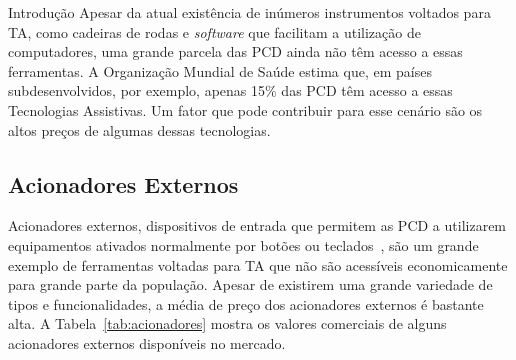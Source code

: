 \begin{chapter}{Introdução}
Apesar da atual existência de inúmeros instrumentos voltados para TA, como
cadeiras de rodas e \textit{software} que facilitam a utilização de
computadores, uma grande parcela das PCD ainda não têm acesso a essas
ferramentas. A Organização Mundial de Saúde estima que, em países
subdesenvolvidos, por exemplo, apenas 15\% das PCD têm acesso a essas Tecnologias
Assistivas\cite{WHO15}. Um fator que pode contribuir para esse cenário são os
altos preços de algumas dessas tecnologias. 

\subsection{Acionadores Externos}

Acionadores externos, dispositivos de entrada que permitem as PCD a utilizarem
equipamentos ativados normalmente por botões ou teclados~\cite{tecla}, são um
grande exemplo de ferramentas voltadas para TA que não são acessíveis
economicamente para grande parte da população. Apesar de existirem uma grande 
variedade de tipos e funcionalidades, a média de preço dos acionadores externos
é bastante alta. A Tabela~\ref{tab:acionadores} mostra os valores comerciais 
de alguns  acionadores externos disponíveis no mercado. 
 

\end{chapter}
